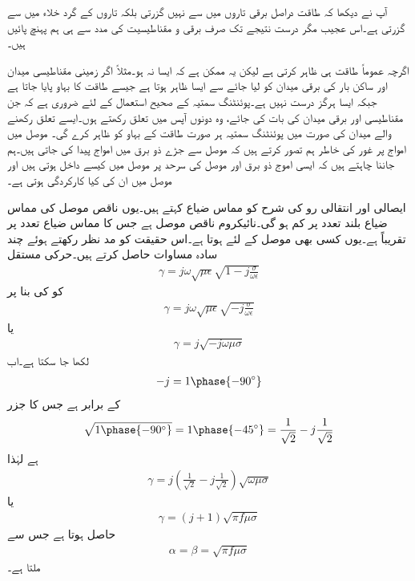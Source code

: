 آپ نے دیکھا کہ طاقت دراصل برقی تاروں میں سے نہیں گزرتی بلکہ تاروں کے گرد خلاء میں سے گزرتی ہے۔اس عجیب مگر درست نتیجے تک صرف برقی و مقناطیسیت کی مدد سے ہی ہم پہنچ پائیں ہیں۔ 

اگرچہ  عموماً طاقت ہی ظاہر کرتی ہے لیکن یہ ممکن ہے کہ ایسا نہ ہو۔مثلاً اگر زمینی مقناطیسی میدان  اور ساکن بار کی برقی میدان  کو لیا جائے  سے ایسا ظاہر ہوتا ہے جیسے طاقت کا بہاو پایا جاتا ہے جبکہ ایسا ہرگز درست نہیں ہے۔پوئنٹنگ سمتیہ کے صحیح استعمال کے لئے ضروری ہے کہ جن مقناطیسی اور برقی میدان کی بات کی جائے، وہ دونوں آپس میں تعلق رکھتے ہوں۔ایسے تعلق رکھنے والے میدان کی صورت میں پوئنٹنگ  سمتیہ ہر صورت طاقت کے بہاو کو ظاہر کرے گی۔ 
موصل میں امواج پر غور کی خاطر ہم تصور کرتے ہیں کہ موصل سے جڑے ذو برق میں امواج پیدا کی جاتی ہیں۔ہم جاننا چاہتے ہیں کہ ایسی اموج ذو برق اور موصل کی سرحد پر موصل میں کیسے داخل ہوتی ہیں اور موصل میں ان کی کیا کارکردگی ہوتی ہے۔

ایصالی اور انتقالی رو کی شرح  کو مماس ضیاع کہتے ہیں۔یوں ناقص موصل کی مماس ضیاع بلند تعدد پر کم ہو گی۔نائیکروم ناقص موصل ہے جس کا مماس ضیاع  تعدد پر  تقریباً  ہے۔یوں کسی بھی موصل کے لئے  ہوتا ہے۔اس حقیقت کو مد نظر رکھتے ہوئے چند سادہ مساوات حاصل کرتے ہیں۔حرکی مستقل
\begin{align*}
\gamma=j \omega \sqrt{\mu \epsilon} \sqrt{1-j \frac{\sigma}{\omega \epsilon}}
\end{align*}
کو  کی بنا پر
\begin{align*}
\gamma=j \omega \sqrt{\mu \epsilon}\sqrt{-j \frac{\sigma}{\omega \epsilon}}
\end{align*}
یا
\begin{align*}
\gamma=j \sqrt{-j \omega \mu \sigma}
\end{align*}
لکھا جا سکتا ہے۔اب
\begin{align*}
-j = 1\phase{-90^\circ}
\end{align*}
کے برابر ہے جس کا جزر
\begin{align*}
\sqrt{1\phase{-90^\circ}}=1\phase{-45^\circ}=\frac{1}{\sqrt{2}}-j \frac{1}{\sqrt{2}}
\end{align*}
ہے لہٰذا
\begin{align*}
\gamma=j \left(\frac{1}{\sqrt{2}}-j \frac{1}{\sqrt{2}}\right)\sqrt{\omega \mu \sigma}
\end{align*}
یا
\begin{align}
\gamma=\left(j+1 \right)\sqrt{\pi f \mu \sigma}
\end{align}
حاصل ہوتا ہے جس سے
\begin{align}
\alpha=\beta=\sqrt{\pi f \mu \sigma}
\end{align}
ملتا ہے۔

